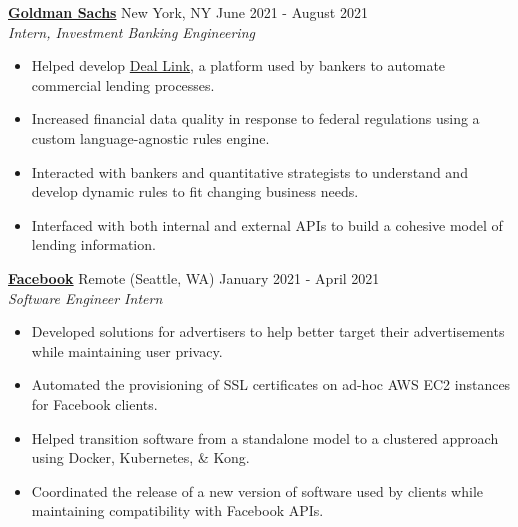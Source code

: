 \documentclass{article}
\begin{document}
  \vspace{3pt}

  \href{https://www.goldmansachs.com/}{\textbf{Goldman Sachs}} \hspace{3pt} {\footnotesize {}} New York, NY \hspace*{\fill} {\footnotesize {}} \hspace{1pt} June 2021 - August 2021\\
  {\footnotesize {}} \hspace{1pt} \textit{Intern, Investment Banking Engineering}
  \begin{itemize}
    \item Helped develop \href{https://www.bloomberg.com/news/articles/2017-06-13/goldman-set-out-to-automate-ipos-and-it-s-come-far-really-fast}{Deal Link}, a platform used by bankers to automate commercial lending processes.
    \item Increased financial data quality in response to federal regulations using a custom language-agnostic rules engine.
    \item Interacted with bankers and quantitative strategists to understand and develop dynamic rules to fit changing business needs.
    \item Interfaced with both internal and external APIs to build a cohesive model of lending information.
  \end{itemize}

  \vspace{3pt}

  \href{https://www.facebook.com/}{\textbf{Facebook}} \hspace{3pt} {\footnotesize {}} Remote (Seattle, WA) \hspace*{\fill} {\footnotesize {}} \hspace{1pt} January 2021 - April 2021\\
  {\footnotesize {}} \hspace{1pt} \textit{Software Engineer Intern} 
  \begin{itemize}
    \item Developed solutions for advertisers to help better target their advertisements while maintaining user privacy.
    \item Automated the provisioning of SSL certificates on ad-hoc AWS EC2 instances for Facebook clients.
    \item Helped transition software from a standalone model to a clustered approach using Docker, Kubernetes, \& Kong.
    \item Coordinated the release of a new version of software used by clients while maintaining compatibility with Facebook APIs.
  \end{itemize}
\end{document}
